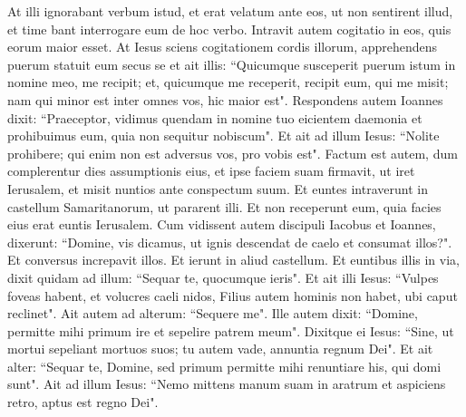 \begin{biblechapter}
\verse At illi ignorabant verbum istud, et erat velatum ante eos, ut non sentirent illud, et time bant interrogare eum de hoc verbo. 
\verse Intravit autem cogitatio in eos, quis eorum maior esset.  
\verse At Iesus sciens cogitationem cordis illorum, apprehendens puerum statuit eum secus se 
\verse et ait illis: “Quicumque susceperit puerum istum in nomine meo, me recipit; et, quicumque me receperit, recipit eum, qui me misit; nam qui minor est inter omnes vos, hic maior est". 
\verse Respondens autem Ioannes dixit: “Praeceptor, vidimus quendam in nomine tuo eicientem daemonia et prohibuimus eum, quia non sequitur nobiscum". 
\verse Et ait ad illum Iesus: “Nolite prohibere; qui enim non est adversus vos, pro vobis est". 
\verse Factum est autem, dum complerentur dies assumptionis eius, et ipse faciem suam firmavit, ut iret Ierusalem, 
\verse et misit nuntios ante conspectum suum. Et euntes intraverunt in castellum Samaritanorum, ut pararent illi. 
\verse Et non receperunt eum, quia facies eius erat euntis Ierusalem. 
\verse Cum vidissent autem discipuli Iacobus et Ioannes, dixerunt: “Domine, vis dicamus, ut ignis descendat de caelo et consumat illos?". 
\verse Et conversus increpavit illos.  
\verse Et ierunt in aliud castellum. 
\verse Et euntibus illis in via, dixit quidam ad illum: “Sequar te, quocumque ieris". 
\verse Et ait illi Iesus: “Vulpes foveas habent, et volucres caeli nidos, Filius autem hominis non habet, ubi caput reclinet". 
\verse Ait autem ad alterum: “Sequere me". Ille autem dixit: “Domine, permitte mihi primum ire et sepelire patrem meum". 
\verse Dixitque ei Iesus: “Sine, ut mortui sepeliant mortuos suos; tu autem vade, annuntia regnum Dei". 
\verse Et ait alter: “Sequar te, Domine, sed primum permitte mihi renuntiare his, qui domi sunt".  
\verse Ait ad illum Iesus: “Nemo mittens manum suam in aratrum et aspiciens retro, aptus est regno Dei". 
\end{biblechapter}

